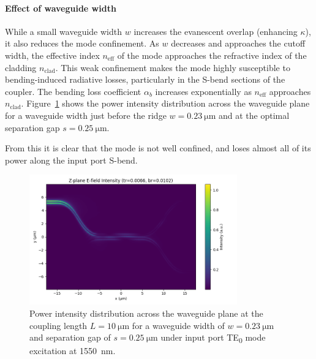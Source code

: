 \documentclass[10pt, a4paper]{article}
\begin{document}
\paragraph{Effect of waveguide width}
While a small waveguide width \(w\) increases the evanescent overlap (enhancing \(\kappa\)),
it also reduces the mode confinement. As \(w\) decreases and approaches the cutoff width, the effective index \(n_\text{eff}\) of the mode approaches the refractive index of the cladding \(n_\text{clad}\).
This weak confinement makes the mode highly susceptible to bending-induced radiative losses, particularly in the S-bend sections of the coupler. The bending loss coefficient \(\alpha_b\) increases exponentially as \(n_\text{eff}\) approaches \(n_\text{clad}\)\autocite{sakaiSimplifiedBendingLoss1979}.
Figure~\ref{fig:high_bend_loss} shows the power intensity distribution across the waveguide plane
for a waveguide width just before the ridge \(w=\SI{0.23}{\um}\) and at the optimal separation gap \(s=\SI{0.25}{\um}\).

From this it is clear that the mode is not well confined, and loses almost all of its power along the input port S-bend.

\begin{figure}[h!]
  \centering
  \includegraphics[width=0.8\textwidth]{task3/sim_0524_120625/z_plane_intensity.png}
  \caption{Power intensity distribution across the waveguide plane at the coupling length \(L=\SI{10}{\um}\) for a waveguide width of \(w=\SI{0.23}{\um}\) and separation gap of \(s=\SI{0.25}{\um}\) under input port TE\textsubscript{0} mode excitation at \SI{1550}{\nm}.}
  \label{fig:high_bend_loss}
\end{figure}
\end{document}
